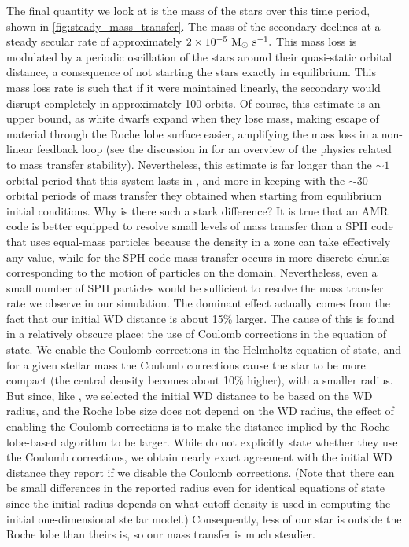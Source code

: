 \documentclass[12pt]{article}
\begin{document}
The final quantity we look at is the mass of the stars over this time period, shown in \autoref{fig:steady_mass_transfer}.
The mass of the secondary declines at a steady secular rate of approximately $2 \times 10^{-5}\ \msolar\ \text{s}^{-1}.$
This mass loss is modulated by a periodic oscillation of the stars around their quasi-static orbital distance,
a consequence of not starting the stars exactly in equilibrium.
This mass loss rate is such that if it were maintained linearly, the secondary would disrupt completely in
approximately 100 orbits. Of course, this estimate is an upper bound, as white dwarfs expand when
they lose mass, making escape of material through the Roche lobe surface easier, amplifying the mass loss
in a non-linear feedback loop (see the discussion in \citealt[Section 2]{dan:2011} for an overview of the
physics related to mass transfer stability). Nevertheless, this estimate is far longer than the $\sim 1$
orbital period that this system lasts in \citet{dan:2011}, and more in keeping with the $\sim 30$ orbital
periods of mass transfer they obtained when starting from equilibrium initial conditions. Why is there
such a stark difference? It is true that an AMR code is better equipped to resolve small levels of mass transfer
than a SPH code that uses equal-mass particles because the density in a zone can take effectively
any value, while for the SPH code mass transfer occurs in more discrete chunks corresponding to the motion of
particles on the domain. Nevertheless, even a small number of SPH particles would be sufficient to
resolve the mass transfer rate we observe in our simulation. The dominant effect actually comes from
the fact that our initial WD distance is about 15\% larger. The cause of this is found in
a relatively obscure place: the use of Coulomb corrections in the equation of state. We enable the Coulomb
corrections in the Helmholtz equation of state, and for a given stellar mass the Coulomb corrections cause
the star to be more compact (the central density becomes about 10\% higher), with a smaller radius. But since,
like \citeauthor{dan:2011}, we selected the initial WD distance to be based on the WD radius, and the Roche lobe
size does not depend on the WD radius, the effect of enabling the Coulomb corrections is to make the distance
implied by the Roche lobe-based algorithm to be larger. While \citeauthor{dan:2011} do not explicitly state whether
they use the Coulomb corrections, we obtain nearly exact agreement with the initial WD distance they report
if we disable the Coulomb corrections. (Note that there can be small differences in the reported radius
even for identical equations of state since the initial radius depends on what cutoff density is used in
computing the initial one-dimensional stellar model.) Consequently, less of our star is outside the
Roche lobe than theirs is, so our mass transfer is much steadier.
\end{document}
